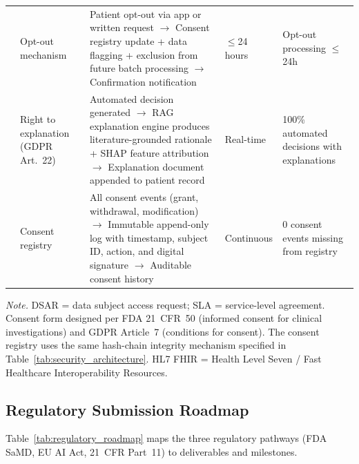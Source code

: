 {\begin{xltabular}{\textwidth}{@{} p{0.4cm} p{1.8cm} L p{1.8cm} p{1.8cm} @{}}
 & Opt-out mechanism & Patient opt-out via app or written request $\to$ Consent registry update + data flagging + exclusion from future batch processing $\to$ Confirmation notification & $\leq$24 hours & Opt-out processing $\leq$24h \\
 & Right to explanation (GDPR Art.~22) & Automated decision generated $\to$ RAG explanation engine produces literature-grounded rationale + SHAP feature attribution $\to$ Explanation document appended to patient record & Real-time & 100\% automated decisions with explanations \\
 & Consent registry & All consent events (grant, withdrawal, modification) $\to$ Immutable append-only log with timestamp, subject ID, action, and digital signature $\to$ Auditable consent history & Continuous & 0 consent events missing from registry \\
\end{xltabular}}
\vspace{0.5em}\noindent\textit{Note.} DSAR = data subject access request; SLA = service-level agreement. Consent form designed per FDA 21~CFR~50 (informed consent for clinical investigations) and GDPR Article~7 (conditions for consent). The consent registry uses the same hash-chain integrity mechanism specified in Table~\ref{tab:security_architecture}. HL7 FHIR = Health Level Seven / Fast Healthcare Interoperability Resources.

\subsection{Regulatory Submission Roadmap}

Table~\ref{tab:regulatory_roadmap} maps the three regulatory pathways (FDA SaMD, EU AI Act, 21~CFR Part~11) to deliverables and milestones.

